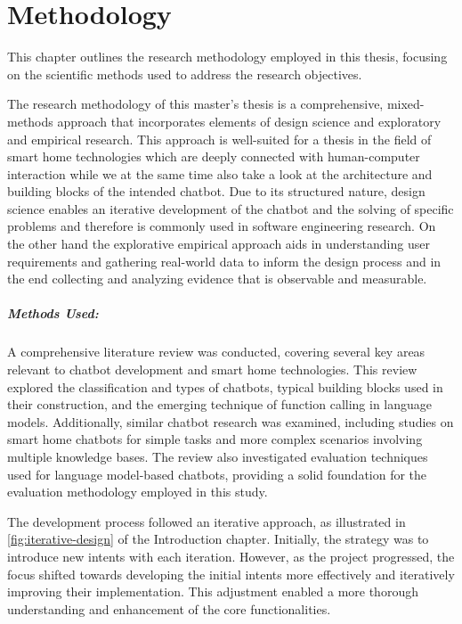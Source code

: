\chapter{Methodology}
\label{chap:method}
This chapter outlines the research methodology employed in this thesis, focusing on the scientific methods used to address the research objectives.

The research methodology of this master's thesis is a comprehensive, mixed-methods approach that incorporates elements of design science and exploratory and empirical research.
This approach is well-suited for a thesis in the field of smart home technologies which are deeply connected with human-computer interaction while we at the same time also take a look at the architecture and building blocks of the intended chatbot.
Due to its structured nature, design science enables an iterative development of the chatbot and the solving of specific problems and therefore is commonly used in software engineering research.
On the other hand the explorative empirical approach aids in understanding user requirements and gathering real-world data to inform the design process and in the end collecting and analyzing evidence that is observable and measurable.

\paragraph{Methods Used:}
A comprehensive literature review was conducted, covering several key areas relevant to chatbot development and smart home technologies. This review explored the classification and types of chatbots, typical building blocks used in their construction, and the emerging technique of function calling in language models. Additionally, similar chatbot research was examined, including studies on smart home chatbots for simple tasks and more complex scenarios involving multiple knowledge bases. The review also investigated evaluation techniques used for language model-based chatbots, providing a solid foundation for the evaluation methodology employed in this study.

The development process followed an iterative approach, as illustrated in \cref{fig:iterative-design} of the Introduction chapter. Initially, the strategy was to introduce new intents with each iteration. However, as the project progressed, the focus shifted towards developing the initial intents more effectively and iteratively improving their implementation. This adjustment enabled a more thorough understanding and enhancement of the core functionalities.

